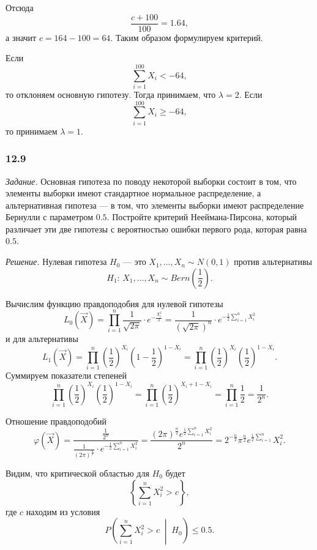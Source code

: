 Отсюда
$$ \frac{c + 100}{100} =
  1.64,$$
а значит $c = 164 - 100 = 64$.
Таким образом формулируем критерий.

Если
$$ \sum \limits_{i = 1}^{100} X_i <
  -64,$$
то отклоняем основную гипотезу.
Тогда принимаем, что $ \lambda = 2$.
Если
$$ \sum \limits_{i = 1}^{100} X_i \geq
  -64,$$
то принимаем $ \lambda = 1$.


\subsubsection*{12.9}

\textit{Задание.}
Основная гипотеза по поводу некоторой выборки состоит в том,
что элементы выборки имеют стандартное нормальное распределение, а альтернативная гипотеза ---
в том, что элементы выборки имеют распределение Бернулли с параметром $0.5$.
Постройте критерий Нееймана-Пирсона,
который различает эти две гипотезы с вероятностью ошибки первого рода, которая равна $0.5$.

\textit{Решение.}
Нулевая гипотеза $H_0$ --- это $X_1, \dotsc, X_n \sim N \left( 0, 1 \right) $ против альтернативы
$$H_1: \,
  X_1, \dotsc, X_n \sim Bern \left( \frac{1}{2} \right).$$

Вычислим функцию правдоподобия для нулевой гипотезы
$$L_0 \left( \vec{X} \right) =
  \prod \limits_{i = 1}^n \frac{1}{ \sqrt{2 \pi }} \cdot e^{- \frac{X_i^2}{2}} =
  \frac{1}{ \left( \sqrt{2 \pi } \right)^n} \cdot e^{- \frac{1}{2} \sum \limits_{i = 1}^n X_i^2}$$
и для альтернативы
$$L_1 \left( \vec{X} \right) =
  \prod \limits_{i = 1}^n
    \left( \frac{1}{2} \right)^{X_i} \left( 1 - \frac{1}{2} \right)^{1 - X_i} =
  \prod \limits_{i = 1}^n \left( \frac{1}{2} \right)^{X_i} \left( \frac{1}{2} \right)^{1 - X_i}.$$
Суммируем показатели степеней
$$ \prod \limits_{i = 1}^n \left( \frac{1}{2} \right)^{X_i} \left( \frac{1}{2} \right)^{1 - X_i} =
  \prod \limits_{i = 1}^n \left( \frac{1}{2} \right)^{X_i + 1 - X_i} =
  \prod \limits_{i = 1}^n \frac{1}{2} =
  \frac{1}{2^n}.$$

Отношение правдоподобий
$$ \varphi \left( \vec{X} \right) =
  \frac{ \frac{1}{2^n}}{ \frac{1}{ \left( 2 \pi \right)^{ \frac{n}{2}}} \cdot e^{- \frac{1}{2} \sum \limits_{i = 1}^n X_i^2}} =
  \frac{ \left( 2 \pi \right)^{ \frac{n}{2}} e^{ \frac{1}{2} \sum \limits_{i = 1}^n X_i^2}}{2^n} =
  2^{- \frac{n}{2}} \pi^{ \frac{n}{2}} e^{ \frac{1}{2} \sum \limits_{i = 1}^n} X_i^2.$$

Видим, что критической областью для $H_0$ будет
$$ \left\{ \sum \limits_{i = 1}^n X_i^2 > c \right\},$$
где $c$ находим из условия
$$P \left( \sum \limits_{i = 1}^n X_i^2 > c \; \middle| \; H_0 \right) \leq
  0.5.$$

